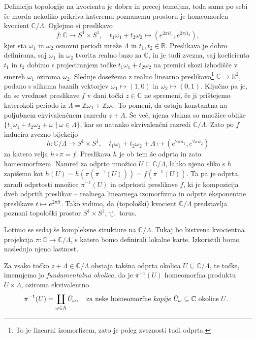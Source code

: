 \documentclass[mat1]{fmfdelo}
\numberwithin{equation}{section}
\newcommand{\R}{\mathbb R}
\newcommand{\Z}{\mathbb Z}
\newcommand{\C}{\mathbb C}
\newcommand{\om}{\omega}
\newcommand{\inv}{^{-1}}
\newcommand{\torus}{\C/\Lambda}
\newcommand{\tj}{tj.\ }
\theoremstyle{definition}
\begin{document}
Definicija topologije na kvocientu je dobra in precej temeljna, toda sama po sebi še morda nekoliko prikriva kateremu poznanemu prostoru je homeomorfen kvocient $\C/\Lambda$. Oglejmo si preslikavo 
\[ 
    f: \C \to S^1 \times S^1, \quad t_1\om_1 + t_2\om_2 \mapsto (e^{2 \pi i t_1}, e^{2 \pi i t_2}),
\]
kjer sta $\om_1$ in $\om_2$ osnovni periodi mreže $\Lambda$ in $t_1, t_2 \in \R$. Preslikava je dobro definirana, saj $\om_1$ in $\om_2$ tvorita realno bazo za $\C$, in je tudi zvezna, saj koeficienta $t_1$ in $t_2$ dobimo s projeciranjem točke $t_1\om_1 + t_2\om_2$ na premici skozi izhodišče v smereh $\om_1$ oziroma $\om_2$. Slednje dosežemo z realno linearno preslikavo\footnote{To je linearni izomorfizem, zato je poleg zveznosti tudi odprta.} $\C \to \R^2$, podano s slikama baznih vektorjev $\om_1 \mapsto (1,0)$ in $\om_2 \mapsto (0,1)$. Ključno pa je, da se vrednost preslikave $f$ v dani točki $z \in \C$ ne spremeni, če ji prištejemo katerokoli periodo iz $\Lambda = \Z\om_1 + \Z\om_2$. To pomeni, da ostaja konstantna na poljubnem ekvivalenčnem razredu $z + \Lambda$. Še več, njena vlakna so množice oblike $\{t_1\om_1 + t_2\om_2 + \om \mid \om \in \Lambda\}$, kar so natanko ekvivalenčni razredi $\C/\Lambda$. Zato po \cite[trditev 3.22]{MrcunTop} $f$ inducira zvezno bijekcijo 
\[
    h: \C/\Lambda \to S^1 \times S^1, \quad t_1\om_1 + t_2\om_2 + \Lambda \mapsto (e^{2 \pi i t_1}, e^{2 \pi i t_2})
\]
za katero velja $h \circ \pi = f$. Preslikava $h$ je ob tem še odprta in zato homeomorfizem. Namreč za odprto množico $U\subseteq \C/\Lambda$, lahko njeno sliko s $h$ zapišemo kot $h(U) = h(\pi(\pi\inv(U))) = f(\pi\inv(U))$. Ta pa je odprta, zaradi odprtosti množice $\pi\inv(U)$ in odprtosti preslikave $f$, ki je kompozicija dveh odprtih preslikav -- realnega linearnega izomorfizma in odprte eksponentne preslikave $t \mapsto e^{2\pi i t}$. Tako vidimo, da (topološki) kvocient $\C/\Lambda$ predstavlja poznani topološki prostor $S^1 \times S^1$, \tj torus.

Lotimo se sedaj še kompleksne strukture na $\torus$. Tukaj bo bistvena kvocientna projekcija $\pi: \C \to \torus$, s katero bomo definirali lokalne karte. Izkoristili bomo naslednjo njeno lastnost. 

\begin{lema}
    \label{pi je krovna}
    Za vsako točko $z + \Lambda \in \torus$ obstaja takšna odprta okolica $U \subseteq \torus$, te točke, imenujemo jo \emph{fundamentalna okolica}, da je $\pi\inv(U)$ homeomorfna produktu $U \times \Lambda$, oziroma ekvivalentno 
    \[
        \pi\inv(U) = \coprod_{\om \in \Lambda} \tilde{U}_\om, \quad \text{za neke homeomorfne \emph{kopije} $\tilde{U}_\om \subseteq \C$ okolice $U$. } 
    \]
\end{lema}
\end{document}
